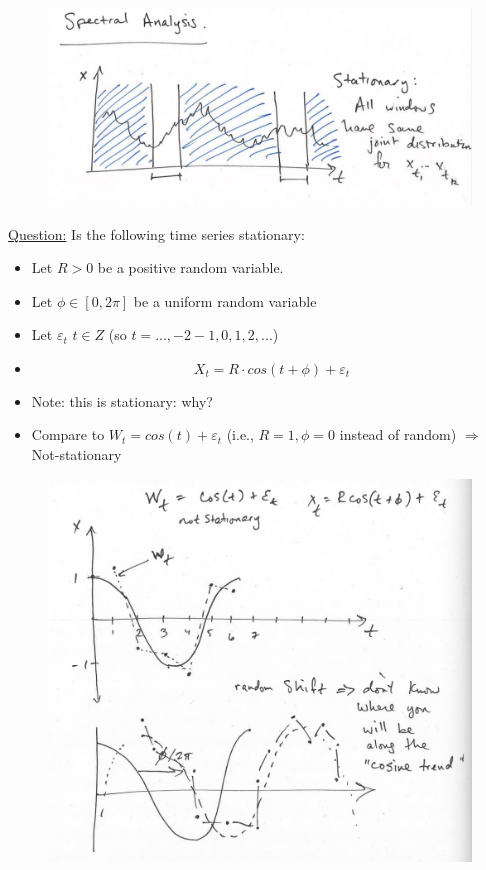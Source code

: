 \begin{figure}[h]
\includegraphics[scale=0.3]{images/Screenshot 2024-04-29 at 08.36.41.jpg}
\centering
\end{figure}


\underline{Question:} \quad Is the following time series stationary:\\
\begin{itemize}
    \item[] Let $R>0$ be a positive random variable.
    \item[] Let $\phi \in [0, 2\pi]$ be a uniform random variable
    \item[] Let $\varepsilon_t$ $t \in Z$ (so $t=...,-2-1,0,1,2,...$)
    \item[] \[X_t = R \cdot cos(t+ \phi) + \varepsilon_t\] 
    \item[] Note: this is stationary: why? 
    \item[] Compare to $W_t = cos(t)+ \varepsilon_t$ (i.e., $R=1, \phi = 0$ instead of random) $\Rightarrow$ Not-stationary 
\end{itemize}

\begin{figure}[h]
\includegraphics[scale=0.25]{images/Screenshot 2024-04-29 at 08.38.34.jpg}
\centering
\end{figure}

